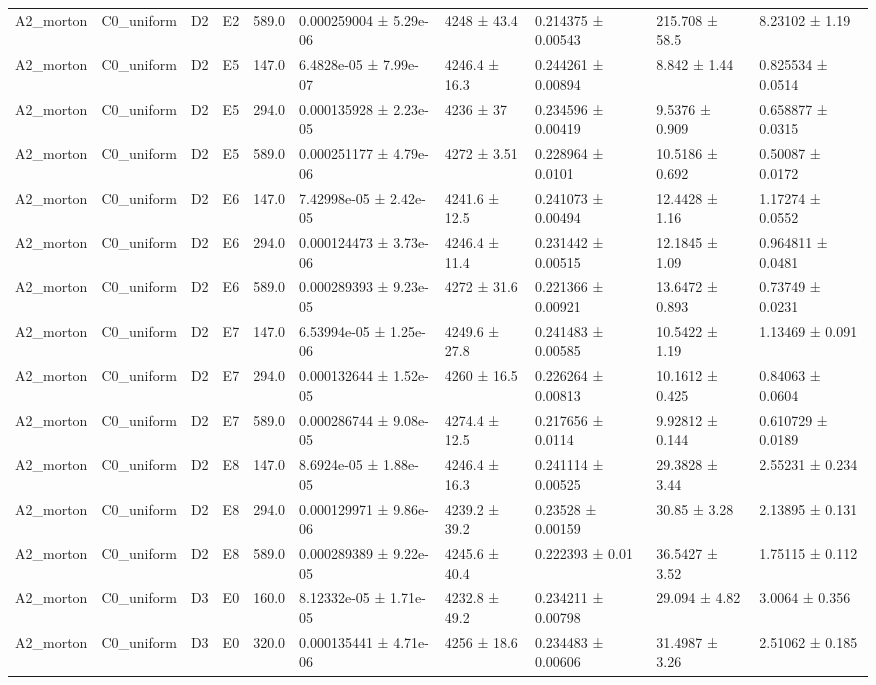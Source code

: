 \begin{table}
\begin{tabular}{llllllllll}
A2\_morton & C0\_uniform & D2 & E2 & 589.0 & 0.000259004 ± 5.29e-06 & 4248 ± 43.4 & 0.214375 ± 0.00543 & 215.708 ± 58.5 & 8.23102 ± 1.19 \\
A2\_morton & C0\_uniform & D2 & E5 & 147.0 & 6.4828e-05 ± 7.99e-07 & 4246.4 ± 16.3 & 0.244261 ± 0.00894 & 8.842 ± 1.44 & 0.825534 ± 0.0514 \\
A2\_morton & C0\_uniform & D2 & E5 & 294.0 & 0.000135928 ± 2.23e-05 & 4236 ± 37 & 0.234596 ± 0.00419 & 9.5376 ± 0.909 & 0.658877 ± 0.0315 \\
A2\_morton & C0\_uniform & D2 & E5 & 589.0 & 0.000251177 ± 4.79e-06 & 4272 ± 3.51 & 0.228964 ± 0.0101 & 10.5186 ± 0.692 & 0.50087 ± 0.0172 \\
A2\_morton & C0\_uniform & D2 & E6 & 147.0 & 7.42998e-05 ± 2.42e-05 & 4241.6 ± 12.5 & 0.241073 ± 0.00494 & 12.4428 ± 1.16 & 1.17274 ± 0.0552 \\
A2\_morton & C0\_uniform & D2 & E6 & 294.0 & 0.000124473 ± 3.73e-06 & 4246.4 ± 11.4 & 0.231442 ± 0.00515 & 12.1845 ± 1.09 & 0.964811 ± 0.0481 \\
A2\_morton & C0\_uniform & D2 & E6 & 589.0 & 0.000289393 ± 9.23e-05 & 4272 ± 31.6 & 0.221366 ± 0.00921 & 13.6472 ± 0.893 & 0.73749 ± 0.0231 \\
A2\_morton & C0\_uniform & D2 & E7 & 147.0 & 6.53994e-05 ± 1.25e-06 & 4249.6 ± 27.8 & 0.241483 ± 0.00585 & 10.5422 ± 1.19 & 1.13469 ± 0.091 \\
A2\_morton & C0\_uniform & D2 & E7 & 294.0 & 0.000132644 ± 1.52e-05 & 4260 ± 16.5 & 0.226264 ± 0.00813 & 10.1612 ± 0.425 & 0.84063 ± 0.0604 \\
A2\_morton & C0\_uniform & D2 & E7 & 589.0 & 0.000286744 ± 9.08e-05 & 4274.4 ± 12.5 & 0.217656 ± 0.0114 & 9.92812 ± 0.144 & 0.610729 ± 0.0189 \\
A2\_morton & C0\_uniform & D2 & E8 & 147.0 & 8.6924e-05 ± 1.88e-05 & 4246.4 ± 16.3 & 0.241114 ± 0.00525 & 29.3828 ± 3.44 & 2.55231 ± 0.234 \\
A2\_morton & C0\_uniform & D2 & E8 & 294.0 & 0.000129971 ± 9.86e-06 & 4239.2 ± 39.2 & 0.23528 ± 0.00159 & 30.85 ± 3.28 & 2.13895 ± 0.131 \\
A2\_morton & C0\_uniform & D2 & E8 & 589.0 & 0.000289389 ± 9.22e-05 & 4245.6 ± 40.4 & 0.222393 ± 0.01 & 36.5427 ± 3.52 & 1.75115 ± 0.112 \\
A2\_morton & C0\_uniform & D3 & E0 & 160.0 & 8.12332e-05 ± 1.71e-05 & 4232.8 ± 49.2 & 0.234211 ± 0.00798 & 29.094 ± 4.82 & 3.0064 ± 0.356 \\
A2\_morton & C0\_uniform & D3 & E0 & 320.0 & 0.000135441 ± 4.71e-06 & 4256 ± 18.6 & 0.234483 ± 0.00606 & 31.4987 ± 3.26 & 2.51062 ± 0.185 \\

\end{tabular}
\end{table}
